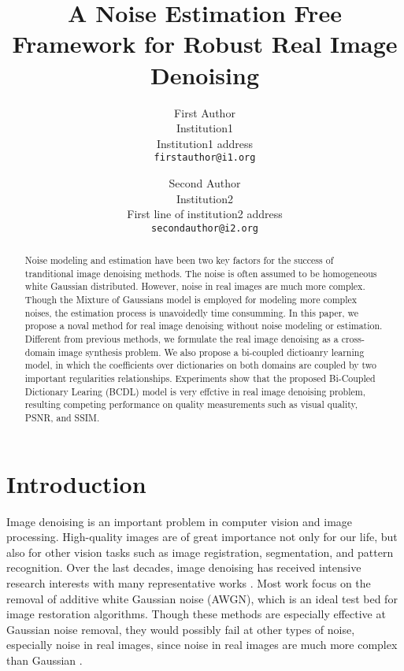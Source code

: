 \documentclass[10pt,twocolumn,letterpaper]{article}
\begin{document}
\title{A Noise Estimation Free Framework for Robust Real Image Denoising}

\author{First Author\\
Institution1\\
Institution1 address\\
{\tt\small firstauthor@i1.org}
\and
Second Author\\
Institution2\\
First line of institution2 address\\
{\tt\small secondauthor@i2.org}
}

\maketitle

\begin{abstract}
Noise modeling and estimation have been two key factors for the success of tranditional image denoising methods. The noise is often assumed to be homogeneous white Gaussian distributed. However, noise in real images are much more complex. Though the Mixture of Gaussians model is employed for modeling more complex noises, the estimation process is unavoidedly time consumming. In this paper, we propose a noval method for real image denoising without noise modeling or estimation. Different from previous methods, we formulate the real image denoising as a cross-domain image synthesis problem. We also propose a bi-coupled dictioanry learning model, in which the coefficients over dictionaries on both domains are coupled by two important regularities  relationships. Experiments show that the proposed Bi-Coupled Dictionary Learing (BCDL) model is very effctive in real image denoising problem, resulting competing performance on quality measurements such as visual quality, PSNR, and SSIM.
\end{abstract}

\section{Introduction}
Image denoising is an important problem in computer vision and image processing. High-quality images are of great importance not only for our life, but also for other vision tasks such as image registration,  segmentation, and pattern recognition. Over the last decades, image denoising has received intensive research interests with many representative works \cite{}. Most work \cite{rudin1992nonlinear,nlm,foe,ksvd,bm3d,lssc,epll,pgpd,wnnm,csf,chen2015learning,burger2012image} focus on the removal of additive white Gaussian noise (AWGN), which is an ideal test bed for image restoration algorithms. Though these methods are especially effective at Gaussian noise removal, they would possibly fail at other types of noise, especially noise in real images, since noise in real images are much more complex than Gaussian \cite{noiseclinic}. 
\end{document}
